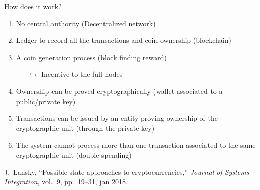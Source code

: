 \documentclass{beamer}
\begin{document}
\begin{frame}{How does it work?}
\begin{enumerate}
  \item No central authority (Decentralized network)
  \item Ledger to record all the transactions and coin ownership (blockchain)
  \item A coin generation process (block finding reward)
    \begin{itemize}
    \item[$\hookrightarrow$] Incentive to the full nodes 
  \end{itemize}
  \item Ownership can be proved cryptographically (wallet associated to a public/private key)
  \item Transactions can be issued by an entity proving ownership of the cryptographic unit (through the private key) 
  \item The system cannot process more than one transaction associated to the same cryptographic unit (double spending)
\end{enumerate}
\tiny
\begin{thebibliography}{1}

J.~Lansky, ``Possible state approaches to cryptocurrencies,'' {\em Journal of
  Systems Integration}, vol.~9, pp.~19--31, jan 2018.

\end{thebibliography}
\end{frame}
\end{document}
